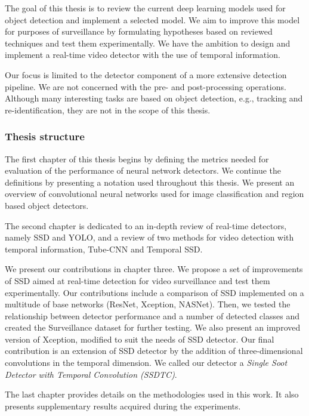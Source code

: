 The goal of this thesis is to review the current deep learning models used for object detection and implement a selected model. We aim to improve this model for purposes of surveillance by formulating hypotheses based on reviewed techniques and test them experimentally. We have the ambition to design and implement a real-time video detector with the use of temporal information.

Our focus is limited to the detector component of a more extensive detection pipeline. We are not concerned with the pre- and post-processing operations. Although many interesting tasks are based on object detection, e.g., tracking and re-identification,  they are not in the scope of this thesis.

\subsubsection{Thesis structure}
The first chapter of this thesis begins by defining the metrics needed for evaluation of the performance of neural network detectors. We continue the definitions by presenting a notation used throughout this thesis. We present an overview of convolutional neural networks used for image classification and region based object detectors. 

The second chapter is dedicated to an in-depth review of real-time detectors, namely SSD and YOLO, and a review of two methods for video detection with temporal information, Tube-CNN and Temporal SSD. 

We present our contributions in chapter three. We propose a set of improvements of SSD aimed at real-time detection for video surveillance and test them experimentally. Our contributions include a comparison of SSD implemented on a multitude of base networks (ResNet, Xception, NASNet). Then, we tested the relationship between detector performance and a number of detected classes and created the Surveillance dataset for further testing. We also present an improved version of Xception, modified to suit the needs of SSD detector. Our final contribution is an extension of SSD detector by the addition of three-dimensional convolutions in the temporal dimension. We called our detector a \textit{Single Soot Detector with Temporal Convolution (SSDTC)}.

The last chapter provides details on the methodologies used in this work. It also presents supplementary results acquired during the experiments.